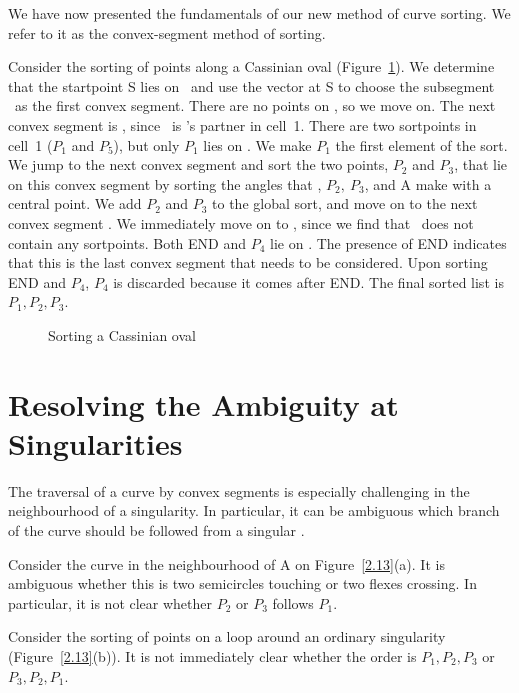 We have now presented the fundamentals of our new method of curve sorting.
We refer to it as the convex-segment method of sorting.
%
\begin{example}
Consider the sorting of points along a Cassinian oval (Figure~\ref{2.12a}).
We determine that the startpoint S 
lies on \ and use the vector at
S to choose the subsegment \ as the first convex segment.
There are no points on , so we move on.
The next convex segment is \arc{\wo\wt}, since \wo\ is \wt's partner in 
cell~1.
There are two sortpoints in cell~1 ($P_{1}$ and $P_{5}$), but only $P_{1}$
lies on \arc{\wo\wt}.
We make $P_{1}$ the first element of the sort.
We jump to the next convex segment  and
sort the two points, $P_{2}$ and $P_{3}$, that lie on this convex segment
by sorting the angles that \wo, $P_{2},\ P_{3}$, and A make with a 
central point. 
We add $P_{2}$ and $P_{3}$ to the global sort, and
move on to the next convex segment .
We immediately move
on to , since we find that \ does not contain any
sortpoints.
Both END and $P_{4}$ lie on .
The presence of END indicates that this is the last convex segment 
that needs to be considered.
Upon sorting END and $P_{4}$, $P_{4}$ is discarded because it comes after END.
The final sorted list is $P_{1},P_{2},P_{3}$.
\end{example}
\begin{figure}[htbp]\vspace{2.75in}\caption{Sorting a Cassinian oval}
\label{2.12a}\end{figure}
%
\section{Resolving the Ambiguity at Singularities}
\label{sec-resolve}

The traversal of a curve by convex segments is especially challenging in 
the neighbourhood of a singularity.
In particular, it can be ambiguous which branch of the curve should be
followed from a singular \wallpoint.
%
\begin{example}
Consider the curve in the neighbourhood of A on Figure~\ref{2.13}(a). 
It is ambiguous whether this is 
two semicircles touching or two flexes crossing.
In particular, it is not clear whether $P_{2}$ or $P_{3}$ follows $P_{1}$.


Consider the sorting of points on a loop around an ordinary 
singularity (Figure~\ref{2.13}(b)).
It is not immediately clear whether the order is \mbox{$P_{1},P_{2},P_{3}$} or
\mbox{$P_{3},P_{2},P_{1}$}.
\end{example}
%


